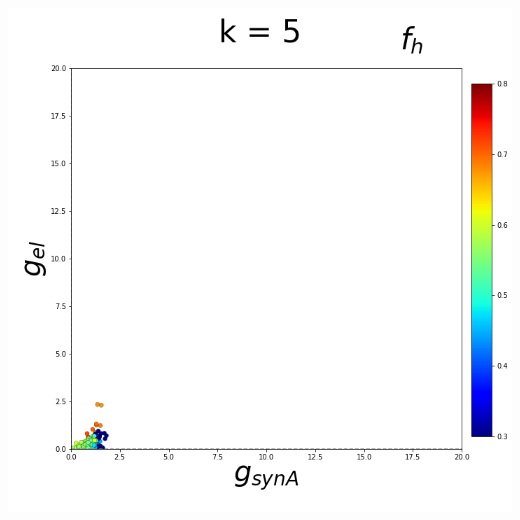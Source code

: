 \documentclass[11pt]{article}
\begin{document}
\begin{center}
\includegraphics[scale=0.125]{DSN_figs/STGCircuit_DSN_c=2_rs=1_k=5.png} \\
{%
\setlength{\fboxsep}{0pt}%
\setlength{\fboxrule}{1pt}%
%
}
\end{center}
\end{document}
